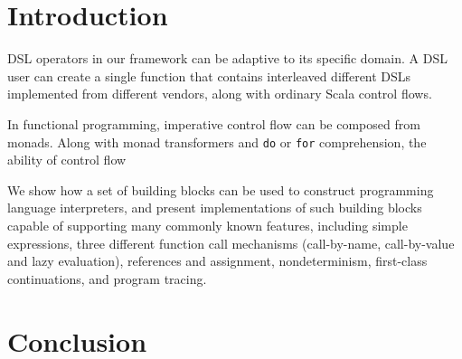 \section{Introduction}
\label{introduction}


DSL operators in our framework can be adaptive to its specific domain. A DSL user can create a single function that contains interleaved different DSLs implemented from different vendors, along with ordinary Scala control flows.

 
In functional programming, imperative control flow can be composed from monads\cite{wadler1990comprehending,wadler1992essence,jones1993composing}.
Along with monad transformers\cite{liang1995monad} and \lstinline{do} or \lstinline{for} comprehension\cite{jones1998haskell,odersky2004scala}, the ability of control flow

We show how a set of building blocks can be used to construct
programming language interpreters, and present implementations
of such building blocks capable of supporting many
commonly known features, including simple expressions,
three different function call mechanisms (call-by-name, call-by-value and lazy evaluation), references and assignment,
nondeterminism, first-class continuations, and program tracing.


\section{Conclusion}
\label{conclusion}


\clearpage
\appendix

\printglossary

\begin{acks}
\end{acks}


